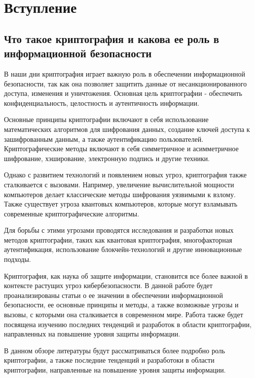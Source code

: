 \documentclass[14pt]{extarticle}
\begin{document}


\onehalfspacing
\tableofcontents
\newpage


\section{Вступление}

\subsection{Что такое криптография и какова ее роль в информационной безопасности}
В наши дни криптография играет важную роль в обеспечении информационной безопасности, так как она позволяет защитить данные от несанкционированного доступа, изменения и уничтожения. Основная цель криптографии - обеспечить конфиденциальность, целостность и аутентичность информации.

Основные принципы криптографии включают в себя использование математических алгоритмов для шифрования данных, создание ключей доступа к зашифрованным данным, а также аутентификацию пользователей. Криптографические методы включают в себя симметричное и асимметричное шифрование, хэширование, электронную подпись и другие техники.

Однако с развитием технологий и появлением новых угроз, криптография также сталкивается с вызовами. Например, увеличение вычислительной мощности компьютеров делает классические методы шифрования уязвимыми к взлому. Также существует угроза квантовых компьютеров, которые могут взламывать современные криптографические алгоритмы.

Для борьбы с этими угрозами проводятся исследования и разработки новых методов криптографии, таких как квантовая криптография, многофакторная аутентификация, использование блокчейн-технологий и другие инновационные подходы.

Криптография, как наука об защите информации, становится все более важной в контексте растущих угроз кибербезопасности. В данной работе будет проанализированы статьи о ее значении  в обеспечении информационной безопасности, ее основные принципы и методы, а также возможные угрозы и вызовы, с которыми она сталкивается в современном мире. Работа также будет посвящена изучению последних тенденций и разработок в области криптографии, направленных на повышение уровня защиты информации.

В данном обзоре литературы будут рассматриваться более подробно роль криптографии, а также последние тенденций и разработоки в области криптографии, направленные на повышение уровня защиты информации.
\end{document}
